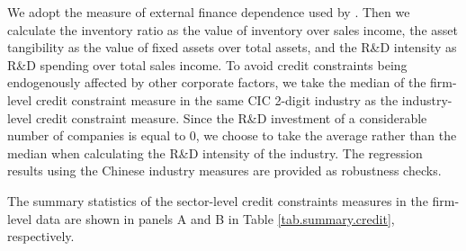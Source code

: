 \documentclass[12pt]{article}
\begin{document}
We adopt the measure of external finance dependence used by \cite{fan-lai-li2015}. Then we calculate the inventory ratio as the value of inventory over sales income, the asset tangibility as the value of fixed assets over total assets, and the R\&D intensity as R\&D spending over total sales income. To avoid credit constraints being endogenously affected by other corporate factors, we take the median of the firm-level credit constraint measure in the same CIC 2-digit industry as the industry-level credit constraint measure. Since the R\&D investment of a considerable number of companies is equal to 0, we choose to take the average rather than the median when calculating the R\&D intensity of the industry. The regression results using the Chinese industry measures are provided as robustness checks.

The summary statistics of the sector-level credit constraints measures in the firm-level data are shown in panels A and B in Table \ref{tab.summary.credit}, respectively.
\end{document}
